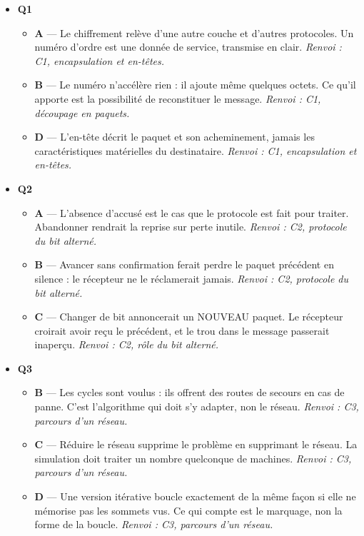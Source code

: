 \begin{itemize}
  \item \textbf{Q1}
  \begin{itemize}
    \item \textbf{A} — Le chiffrement relève d'une autre couche et d'autres protocoles. Un numéro d'ordre est une donnée de service, transmise en clair. \emph{Renvoi : C1, encapsulation et en-têtes.}
    \item \textbf{B} — Le numéro n'accélère rien : il ajoute même quelques octets. Ce qu'il apporte est la possibilité de reconstituer le message. \emph{Renvoi : C1, découpage en paquets.}
    \item \textbf{D} — L'en-tête décrit le paquet et son acheminement, jamais les caractéristiques matérielles du destinataire. \emph{Renvoi : C1, encapsulation et en-têtes.}
  \end{itemize}
  \item \textbf{Q2}
  \begin{itemize}
    \item \textbf{A} — L'absence d'accusé est le cas que le protocole est fait pour traiter. Abandonner rendrait la reprise sur perte inutile. \emph{Renvoi : C2, protocole du bit alterné.}
    \item \textbf{B} — Avancer sans confirmation ferait perdre le paquet précédent en silence : le récepteur ne le réclamerait jamais. \emph{Renvoi : C2, protocole du bit alterné.}
    \item \textbf{C} — Changer de bit annoncerait un NOUVEAU paquet. Le récepteur croirait avoir reçu le précédent, et le trou dans le message passerait inaperçu. \emph{Renvoi : C2, rôle du bit alterné.}
  \end{itemize}
  \item \textbf{Q3}
  \begin{itemize}
    \item \textbf{B} — Les cycles sont voulus : ils offrent des routes de secours en cas de panne. C'est l'algorithme qui doit s'y adapter, non le réseau. \emph{Renvoi : C3, parcours d'un réseau.}
    \item \textbf{C} — Réduire le réseau supprime le problème en supprimant le réseau. La simulation doit traiter un nombre quelconque de machines. \emph{Renvoi : C3, parcours d'un réseau.}
    \item \textbf{D} — Une version itérative boucle exactement de la même façon si elle ne mémorise pas les sommets vus. Ce qui compte est le marquage, non la forme de la boucle. \emph{Renvoi : C3, parcours d'un réseau.}

\end{itemize}
\end{itemize}
